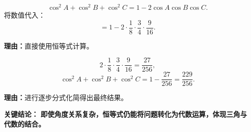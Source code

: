 \begin{examplebox}
\begin{description}[style=nextline, leftmargin=2.8em, labelsep=0.5em, itemsep=0.45em]
    \item[\textbf{第三步（代入恒等式）：}] 
    \[
    \cos^2 A+\cos^2 B+\cos^2 C = 1 - 2\cos A\cos B\cos C.
    \]
    将数值代入：
    \[
    = 1 - 2\cdot\frac{1}{8}\cdot\frac{3}{4}\cdot\frac{9}{16}.
    \]
    \par\textbf{理由：}直接使用恒等式计算。

    \item[\textbf{第四步（化简得值）：}] 
    \[
    2\cdot\frac{1}{8}\cdot\frac{3}{4}\cdot\frac{9}{16} = \frac{27}{256},
    \]
    \[
    \cos^2 A+\cos^2 B+\cos^2 C = 1 - \frac{27}{256} = \frac{229}{256}.
    \]
    \par\textbf{理由：}进行逐步分式化简得出最终结果。
\end{description}

\textbf{\textcolor{CExample}{关键结论：}} \textbf{即使角度关系复杂，恒等式仍能将问题转化为代数运算，体现三角与代数的结合。}
\end{examplebox}
